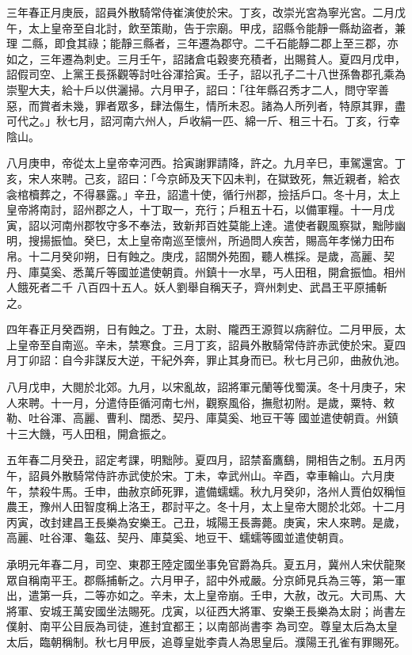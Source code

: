 \begin{pinyinscope}
 三年春正月庚辰，詔員外散騎常侍崔演使於宋。丁亥，改崇光宮為寧光宮。二月戊午，太上皇帝至自北討，飲至策勛，告于宗廟。甲戌，詔縣令能靜一縣劫盜者，兼理
 二縣，即食其祿；能靜三縣者，三年遷為郡守。二千石能靜二郡上至三郡，亦如之，三年遷為刺史。三月壬午，詔諸倉屯穀麥充積者，出賜貧人。夏四月戊申，詔假司空、上黨王長孫觀等討吐谷渾拾寅。壬子，詔以孔子二十八世孫魯郡孔乘為崇聖大夫，給十戶以供灑掃。六月甲子，詔曰：「往年縣召秀才二人，問守宰善惡，而賞者未幾，罪者眾多，肆法傷生，情所未忍。諸為人所列者，特原其罪，盡可代之。」秋七月，詔河南六州人，戶收絹一匹、綿一斤、租三十石。丁亥，行幸陰山。



 八月庚申，帝從太上皇帝幸河西。拾寅謝罪請降，許之。九月辛巳，車駕還宮。丁
 亥，宋人來聘。己亥，詔曰：「今京師及天下囚未判，在獄致死，無近親者，給衣衾棺櫝葬之，不得暴露。」辛丑，詔遣十使，循行州郡，撿括戶口。冬十月，太上皇帝將南討，詔州郡之人，十丁取一，充行；戶租五十石，以備軍糧。十一月戊寅，詔以河南州郡牧守多不奉法，致新邦百姓莫能上達。遣使者觀風察獄，黜陟幽明，搜揚振恤。癸巳，太上皇帝南巡至懷州，所過問人疾苦，賜高年孝悌力田布帛。十二月癸卯朔，日有蝕之。庚戌，詔關外苑囿，聽人樵採。是歲，高麗、契丹、庫莫奚、悉萬斤等國並遣使朝貢。州鎮十一水旱，丐人田租，開倉振恤。相州人餓死者二千
 八百四十五人。妖人劉舉自稱天子，齊州刺史、武昌王平原捕斬之。



 四年春正月癸酉朔，日有蝕之。丁丑，太尉、隴西王源賀以病辭位。二月甲辰，太上皇帝至自南巡。辛未，禁寒食。三月丁亥，詔員外散騎常侍許赤武使於宋。夏四月丁卯詔：自今非謀反大逆，干紀外奔，罪止其身而已。秋七月己卯，曲赦仇池。



 八月戊申，大閱於北郊。九月，以宋亂故，詔將軍元蘭等伐蜀漢。冬十月庚子，宋人來聘。十一月，分遣侍臣循河南七州，觀察風俗，撫慰初附。是歲，粟特、敕勒、吐谷渾、高麗、曹利、闊悉、契丹、庫莫奚、地豆干等
 國並遣使朝貢。州鎮十三大饑，丐人田租，開倉振之。



 五年春二月癸丑，詔定考課，明黜陟。夏四月，詔禁畜鷹鷂，開相告之制。五月丙午，詔員外散騎常侍許赤武使於宋。丁未，幸武州山。辛酉，幸車輪山。六月庚午，禁殺牛馬。壬申，曲赦京師死罪，遣備蠕蠕。秋九月癸卯，洛州人賈伯奴稱恒農王，豫州人田智度稱上洛王，郡討平之。冬十月，太上皇帝大閱於北郊。十二月丙寅，改封建昌王長樂為安樂王。己丑，城陽王長壽薨。庚寅，宋人來聘。是歲，高麗、吐谷渾、龜茲、契丹、庫莫奚、地豆干、蠕蠕等國並遣使朝貢。



 承明元年春二月，司空、東郡王陸定國坐事免官爵為兵。夏五月，冀州人宋伏龍聚眾自稱南平王。郡縣捕斬之。六月甲子，詔中外戒嚴。分京師見兵為三等，第一軍出，遣第一兵，二等亦如之。辛未，太上皇帝崩。壬申，大赦，改元。大司馬、大將軍、安城王萬安國坐法賜死。戊寅，以征西大將軍、安樂王長樂為太尉；尚書左僕射、南平公目辰為司徒，進封宜都王；以南部尚書李為司空。尊皇太后為太皇太后，臨朝稱制。秋七月甲辰，追尊皇妣李貴人為思皇后。濮陽王孔雀有罪賜死。




\end{pinyinscope}
